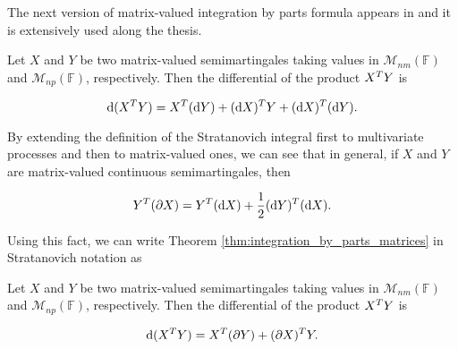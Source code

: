 The next version of matrix-valued integration by parts formula appears in \cite{bru1989diffusions} and it is extensively used along the thesis.

\begin{theorem} \label{thm:integration_by_parts_matrices}
    Let $X$ and $Y$ be two matrix-valued semimartingales taking values in $\mathcal M_{nm}(\mathbb F)$ and $\mathcal M_{np}(\mathbb F)$, respectively. Then the differential of the product $X^TY$ is

    \begin{equation*}
        \mathrm d (X^TY) = X^T(\mathrm d Y) + (\mathrm d X)^T Y + (\mathrm d X)^T(\mathrm d Y).
    \end{equation*}
\end{theorem}

By extending the definition of the Stratanovich integral first to multivariate processes and then to matrix-valued ones, we can see that in general, if $X$ and $Y$ are matrix-valued continuous semimartingales, then

\begin{equation*}
    Y^T (\partial X) = Y^T (\mathrm d X) + \frac12 (\mathrm d Y)^T(\mathrm d X).
\end{equation*}

Using this fact, we can write Theorem \ref{thm:integration_by_parts_matrices} in Stratanovich notation as 

\begin{theorem}
    Let $X$ and $Y$ be two matrix-valued semimartingales taking values in $\mathcal M_{nm}(\mathbb F)$ and $\mathcal M_{np}(\mathbb F)$, respectively. Then the differential of the product $X^TY$ is

    \begin{equation*}
        \mathrm d (X^TY) = X^T(\partial Y) + (\partial X)^T Y.
    \end{equation*}
\end{theorem}
